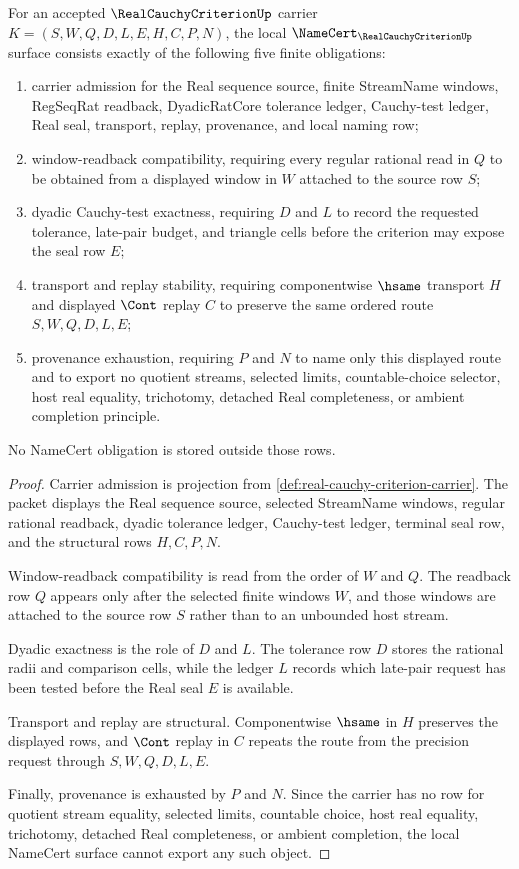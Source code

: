 \begin{theorem}
\label{thm:real-cauchy-criterion-namecert-obligations}
For an accepted $\RealCauchyCriterionUp$ carrier $K=(S,W,Q,D,L,E,H,C,P,N)$, the local $\NameCert_{\RealCauchyCriterionUp}$ surface consists exactly of the following five finite obligations:
\begin{enumerate}
\item carrier admission for the Real sequence source, finite StreamName windows, RegSeqRat readback, DyadicRatCore tolerance ledger, Cauchy-test ledger, Real seal, transport, replay, provenance, and local naming row;
\item window-readback compatibility, requiring every regular rational read in $Q$ to be obtained from a displayed window in $W$ attached to the source row $S$;
\item dyadic Cauchy-test exactness, requiring $D$ and $L$ to record the requested tolerance, late-pair budget, and triangle cells before the criterion may expose the seal row $E$;
\item transport and replay stability, requiring componentwise $\hsame$ transport $H$ and displayed $\Cont$ replay $C$ to preserve the same ordered route $S,W,Q,D,L,E$;
\item provenance exhaustion, requiring $P$ and $N$ to name only this displayed route and to export no quotient streams, selected limits, countable-choice selector, host real equality, trichotomy, detached Real completeness, or ambient completion principle.
\end{enumerate}
No NameCert obligation is stored outside those rows.
\end{theorem}
\begin{proof}
Carrier admission is projection from \autoref{def:real-cauchy-criterion-carrier}. The packet displays the Real sequence source, selected StreamName windows, regular rational readback, dyadic tolerance ledger, Cauchy-test ledger, terminal seal row, and the structural rows $H,C,P,N$.

Window-readback compatibility is read from the order of $W$ and $Q$. The readback row $Q$ appears only after the selected finite windows $W$, and those windows are attached to the source row $S$ rather than to an unbounded host stream.

Dyadic exactness is the role of $D$ and $L$. The tolerance row $D$ stores the rational radii and comparison cells, while the ledger $L$ records which late-pair request has been tested before the Real seal $E$ is available.

Transport and replay are structural. Componentwise $\hsame$ in $H$ preserves the displayed rows, and $\Cont$ replay in $C$ repeats the route from the precision request through $S,W,Q,D,L,E$.

Finally, provenance is exhausted by $P$ and $N$. Since the carrier has no row for quotient stream equality, selected limits, countable choice, host real equality, trichotomy, detached Real completeness, or ambient completion, the local NameCert surface cannot export any such object.
\end{proof}

